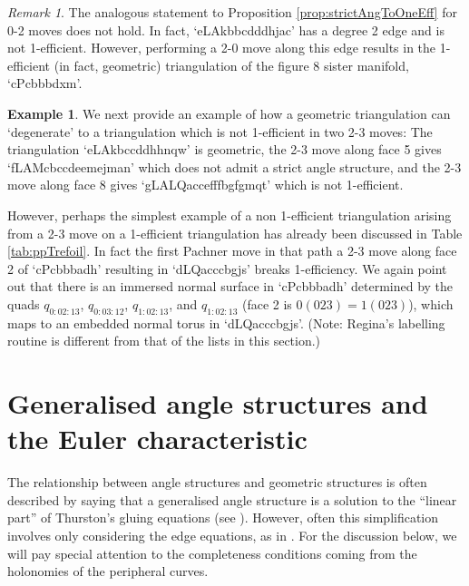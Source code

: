 \documentclass[12pt,reqno]{amsart}  %
\theoremstyle{definition}
\newtheorem{ex}[thm]{Example}
\theoremstyle{remark}
\newtheorem{rmk}[thm]{Remark}
\newcommand{\sect}{\textsection}
\begin{document}
\begin{rmk}
The analogous statement to Proposition \ref{prop:strictAngToOneEff} for 
0-2 moves does not hold. 
In fact, `eLAkbbcdddhjac' has a degree 2 edge and is not 1-efficient. 
However, performing a 2-0 move along this edge results 
in the  1-efficient (in fact, geometric) triangulation of the figure 8 
sister manifold, `cPcbbbdxm'.
\end{rmk}

\begin{ex}
We next provide an example of how a geometric triangulation can `degenerate' 
to a triangulation which is not 1-efficient in two 2-3 moves:  
The triangulation `eLAkbccddhhnqw' is geometric, the 2-3 move along face 
5 gives `fLAMcbccdeemejman' which does not admit a strict angle structure, 
and the 2-3 move along face 8 gives `gLALQaccefffbgfgmqt' which is not 
1-efficient. 

However, perhaps the simplest example of a non 1-efficient triangulation 
arising from a 2-3 move on a 1-efficient triangulation has already 
been discussed in Table \ref{tab:ppTrefoil}. In fact the first Pachner move 
in that path a 2-3 move along face 2 of `cPcbbbadh' resulting 
in `dLQacccbgjs' breaks 1-efficiency. 
We again point out that there is an immersed normal surface in `cPcbbbadh' 
determined by the quads $q_{0:02:13}$, $q_{0:03:12}$, $q_{1:02:13}$, 
and $q_{1:02:13}$ (face 2 is $0(023)=1(023)$), which maps to an embedded normal 
torus in `dLQacccbgjs'. (Note: Regina's labelling routine is different 
from that of the lists in this section.)
\end{ex}


\appendix

\section{Generalised angle structures and the Euler characteristic}
\label{gen_angle_euler}

The relationship between angle structures and geometric structures is often 
described by saying that a generalised angle structure is a solution to the 
``linear part'' of Thurston's gluing equations (see \cite[\sect 4]{Th}). 
However, often this simplification involves only considering the edge 
equations, as in \cite{LT}. 
For the discussion below, we will pay special attention to the 
completeness conditions coming from the 
holonomies of the peripheral curves. 
\end{document}
